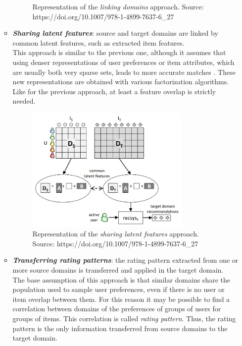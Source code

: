 \begin{itemize}
\begin{itemize}
\begin{figure}[hbt!]
  \caption{Representation of the \textit{linking domains} approach. Source: https://doi.org/10.1007/978-1-4899-7637-6\_27}
\end{figure}
\item \textbf{\textit{Sharing latent features}}: source and target domains are linked by common latent features, such as extracted item features.\\
This approach is similar to the previous one, although it assumes that using denser representations of user preferences or item attributes, which are usually both very sparse sets, leads to more accurate matches \cite{10.5555/2283696.2283784, 10.5555/2898607.2898644}. These new representations are obtained with various factorization algorithms. Like for the previous approach, at least a feature overlap is strictly needed.
\begin{figure}[hbt!]
  \centering
  \includegraphics[width=0.8\textwidth]{pictures/sharing-latent-features}
  \caption{Representation of the \textit{sharing latent features} approach. Source: https://doi.org/10.1007/978-1-4899-7637-6\_27}
\end{figure}
\item \textbf{\textit{Transferring rating patterns}}: the rating pattern extracted from one or more source domains is transferred and applied in the target domain.\\
The base assumption of this approach is that similar domains share the population used to sample user preferences, even if there is no user or item overlap between them. For this reason it may be possible to find a correlation between domains of the preferences of groups of users for groups of items. This correlation is called \textit{rating pattern}. Thus, the rating pattern is the only information transferred from source domains to the target domain.\\

\end{itemize}
\end{itemize}
